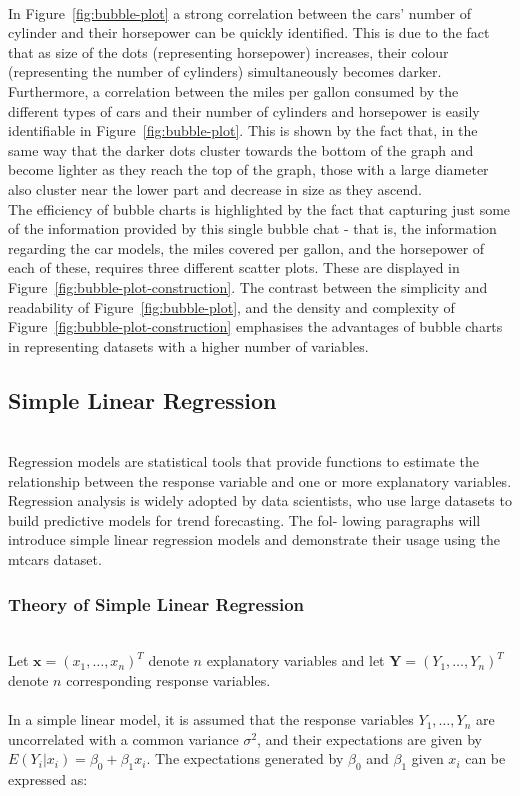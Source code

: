 \documentclass{article}\usepackage[]{graphicx}\usepackage[]{xcolor}
\numberwithin{equation}{section}
\begin{document}
\\\noindent In Figure~\ref{fig:bubble-plot} a strong correlation between the cars' number of cylinder and their horsepower can be quickly identified. This is due to the fact that as size of the dots (representing horsepower) increases, their colour (representing the number of cylinders) simultaneously becomes darker. Furthermore, a correlation between the miles per gallon consumed by the different types of cars and their number of cylinders and horsepower is easily identifiable in Figure~\ref{fig:bubble-plot}. This is shown by the fact that, in the same way that the darker dots cluster towards the bottom of the graph and become lighter as they reach the top of the graph, those with a large diameter also cluster near the lower part and decrease in size as they ascend. \\ 

\noindent 
The efficiency of bubble charts is highlighted by the fact that capturing just some of the information provided by this single bubble chat - that is, the information regarding the car models, the miles covered per gallon, and the horsepower of each of these, requires three different scatter plots. These are displayed in Figure~\ref{fig:bubble-plot-construction}. The contrast between the simplicity and readability of Figure~\ref{fig:bubble-plot}, and the density and complexity of Figure~\ref{fig:bubble-plot-construction} emphasises the advantages of bubble charts in representing datasets with a higher number of variables. 


\subsection{Simple Linear Regression}
\\Regression models are statistical tools that provide functions to estimate the relationship between the response variable and one or more explanatory variables. Regression analysis is widely adopted by data scientists, who use large datasets to build predictive models for trend forecasting. The fol- lowing paragraphs will introduce simple linear regression models and demonstrate their usage using the mtcars dataset.

\subsubsection{Theory of Simple Linear Regression} 

\\Let $\mathbf{x} = (x_1, \dots, x_n)^T$ denote $n$ explanatory variables and let $\mathbf{Y} = (Y_1, \dots, Y_n)^T$ denote $n$ corresponding response variables.
\\  
\\In a simple linear model, it is assumed that the response variables $Y_1, \dots, Y_n$ are uncorrelated with a common variance $\sigma^2$, and their expectations are given by $E(Y_i| x_i) = \beta_0 + \beta_1 x_i$. The expectations generated by $\beta_0$ and $\beta_1$ given $x_i$ can be expressed as:
\end{document}

